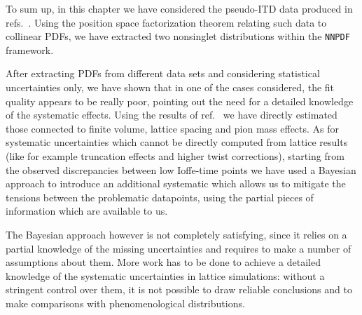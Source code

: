 To sum up, in this chapter
we have considered the pseudo-ITD data produced in refs.~\cite{Joo:2019jct,Joo:2020spy}. Using the
position space factorization theorem relating such data to collinear PDFs, we have extracted two nonsinglet distributions 
within the {\tt NNPDF} framework. 

%
After extracting PDFs from different data sets and 
considering statistical uncertainties only, 
we have shown that in one of the cases considered, the fit quality appears to be really poor,
pointing out the need for a detailed knowledge of the systematic effects.
Using the results of ref.~\cite{Joo:2019jct,Joo:2020spy} we have directly estimated those connected to finite volume, lattice spacing
and pion mass effects. As for systematic uncertainties which cannot be directly computed from lattice results (like
for example truncation effects and higher twist corrections), starting from
the observed discrepancies between low Ioffe-time points we have used a Bayesian approach to introduce an additional systematic 
which allows us to mitigate the tensions between the problematic datapoints, using the partial pieces of information which are available to us.

%
The Bayesian approach however is not completely satisfying, since it relies on a partial knowledge of the
missing uncertainties and requires to make a number of assumptions about them. More work has to be done
to achieve a detailed knowledge of the systematic uncertainties in lattice simulations: 
without a stringent control over them, it is not possible to draw reliable conclusions and
to make comparisons with phenomenological distributions. 

